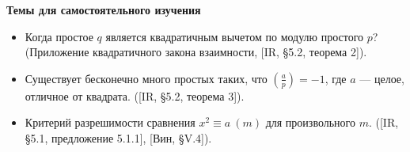 \documentclass[a4paper, 11pt]{article}
\begin{document}

    

\noindent\textbf{Темы для самостоятельного изучения}
\begin{itemize}[topsep=0pt]
    \item Когда простое $q$ является квадратичным вычетом по модулю простого $p$? (Приложение квадратичного закона взаимности, [IR, \S 5.2, теорема 2]).
    \item Существует бесконечно много простых таких, что $\left(\frac{a}{p}\right)=-1$, где $a$ --- целое, отличное от квадрата. ([IR, \S 5.2, теорема 3]).
    \item Критерий разрешимости сравнения $x^2\equiv a\ (m)$ для произвольного $m$. ([IR, \S 5.1, предложение 5.1.1], [Вин, \S V.4]).
\end{itemize}
\end{document}
